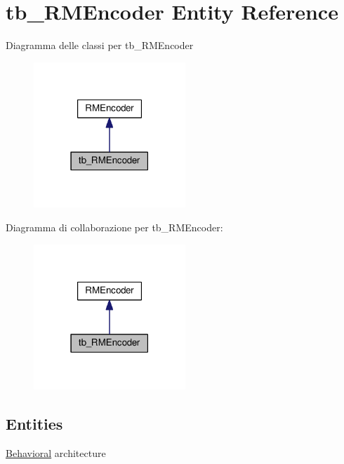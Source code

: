 \hypertarget{classtb___r_m_encoder}{\section{tb\+\_\+\+R\+M\+Encoder Entity Reference}
\label{classtb___r_m_encoder}
}


Diagramma delle classi per tb\+\_\+\+R\+M\+Encoder\nopagebreak
\begin{figure}[H]
\begin{center}
\leavevmode
\includegraphics[width=162pt]{classtb___r_m_encoder__inherit__graph}
\end{center}
\end{figure}


Diagramma di collaborazione per tb\+\_\+\+R\+M\+Encoder\+:\nopagebreak
\begin{figure}[H]
\begin{center}
\leavevmode
\includegraphics[width=162pt]{classtb___r_m_encoder__coll__graph}
\end{center}
\end{figure}
\subsection*{Entities}
\begin{DoxyCompactItemize}
\item 
\hyperlink{classtb___r_m_encoder_1_1_behavioral}{Behavioral} architecture
\end{DoxyCompactItemize}
